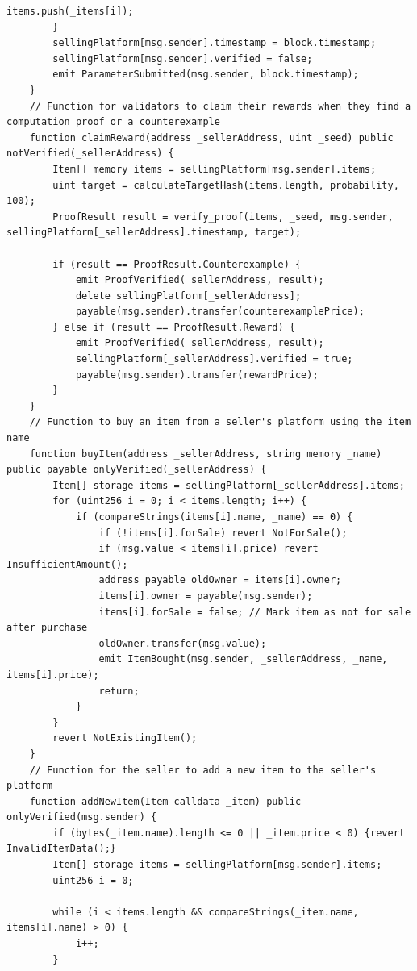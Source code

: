\documentclass[runningheads]{llncs}
\begin{document}
\begin{lstlisting}[numbers=none]
            items.push(_items[i]);
        }
        sellingPlatform[msg.sender].timestamp = block.timestamp;
        sellingPlatform[msg.sender].verified = false;
        emit ParameterSubmitted(msg.sender, block.timestamp);
    }
    // Function for validators to claim their rewards when they find a computation proof or a counterexample
    function claimReward(address _sellerAddress, uint _seed) public notVerified(_sellerAddress) {
        Item[] memory items = sellingPlatform[msg.sender].items;
        uint target = calculateTargetHash(items.length, probability, 100);
        ProofResult result = verify_proof(items, _seed, msg.sender, sellingPlatform[_sellerAddress].timestamp, target);

        if (result == ProofResult.Counterexample) {
            emit ProofVerified(_sellerAddress, result);
            delete sellingPlatform[_sellerAddress];
            payable(msg.sender).transfer(counterexamplePrice);
        } else if (result == ProofResult.Reward) {
            emit ProofVerified(_sellerAddress, result);
            sellingPlatform[_sellerAddress].verified = true;
            payable(msg.sender).transfer(rewardPrice);
        }
    }
    // Function to buy an item from a seller's platform using the item name
    function buyItem(address _sellerAddress, string memory _name) public payable onlyVerified(_sellerAddress) {
        Item[] storage items = sellingPlatform[_sellerAddress].items;
        for (uint256 i = 0; i < items.length; i++) {
            if (compareStrings(items[i].name, _name) == 0) {
                if (!items[i].forSale) revert NotForSale();
                if (msg.value < items[i].price) revert InsufficientAmount();
                address payable oldOwner = items[i].owner;
                items[i].owner = payable(msg.sender);
                items[i].forSale = false; // Mark item as not for sale after purchase
                oldOwner.transfer(msg.value);
                emit ItemBought(msg.sender, _sellerAddress, _name, items[i].price);
                return;
            }
        }
        revert NotExistingItem();
    }
    // Function for the seller to add a new item to the seller's platform
    function addNewItem(Item calldata _item) public onlyVerified(msg.sender) {
        if (bytes(_item.name).length <= 0 || _item.price < 0) {revert InvalidItemData();}
        Item[] storage items = sellingPlatform[msg.sender].items;
        uint256 i = 0;

        while (i < items.length && compareStrings(_item.name, items[i].name) > 0) {
            i++;
        }


\end{lstlisting}
\end{document}
